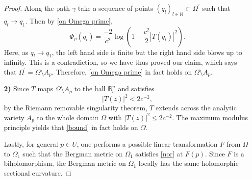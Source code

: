 \documentclass[12pt] {article}
\numberwithin{equation}{section}
\begin{document}
\begin{proof}
 Along the path  $\gamma$ take a sequence of points $(q_l)_{l \in \mathbb N} \subset \Omega^{\prime}$ such that $q_l  \to q_1$. 
 Then by \eqref{on Omega prime},
$$
\Phi_{p}(q_l )=  {\frac{-2}{c^2}} \log  \left (1 - \frac{c^2}{2} |T(q_l)|^2 \right ).
$$
Here, as  $q_l  \to q_1$,  the left hand side is finite but  the right hand side  blows up to infinity.  This  is  a contradiction, so we have thus proved our claim, which says that $\Omega^{\prime}=  \Omega \setminus A_p $.
Therefore, \eqref{on Omega prime} in fact holds on $\Omega \setminus A_p $.


\medskip


{\bf 2)} Since $T$ maps $ \Omega \setminus A_p$ to the ball $ \mathbb B_c^n$ and satisfies 
\begin{equation} \label{bound}
|T(z)|^2<  {2}{ c^{-2}},
\end{equation}
by the Riemann removable singularity theorem, $T$ extends across the analytic variety $A_p$ to the whole domain $\Omega$ with $|T(z)|^2 \leq {2}{ c^{-2}}.$
  The maximum modulus principle yields  that \eqref{bound} in fact holds  on $\Omega$. 


 \medskip


Lastly, for general $p \in U$, one performs a possible linear transformation $F$ from $\Omega$ to $\Omega_1$ such that the Bergman metric on $\Omega_1$  satisfies \eqref{nor} at $F (p)$. Since $F$ is a biholomorphism, the Bergman metric on $\Omega_1$   locally has the same holomorphic sectional curvature. 


 \medskip


\end{proof}
\end{document}
